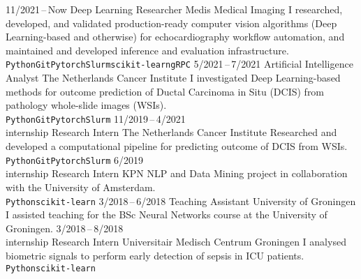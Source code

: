 \documentclass[9pt]{developercv}
\begin{document}


\begin{entrylist}
\entry
    {11/2021\,--\,Now}
    {Deep Learning Researcher}
    {Medis Medical Imaging}
    {I researched, developed, and validated production-ready computer vision algorithms (Deep Learning-based and otherwise) for echocardiography workflow automation, and maintained and developed inference and evaluation infrastructure.\\
    \texttt{Python}\slashsep\texttt{Git}\slashsep\texttt{Pytorch}\slashsep\texttt{Slurm}\slashsep\texttt{scikit-learn}\slashsep\texttt{gRPC}}
\entry
    {5/2021\,--\,7/2021}
    {Artificial Intelligence Analyst}
    {The Netherlands Cancer Institute}
    {I investigated Deep Learning-based methods for outcome prediction of Ductal Carcinoma in Situ (DCIS) from pathology whole-slide images (WSIs).\\
    \texttt{Python}\slashsep\texttt{Git}\slashsep\texttt{Pytorch}\slashsep\texttt{Slurm}}
\entry
    {11/2019\,--\,4/2021\\\footnotesize{internship}}
    {Research Intern}
    {The Netherlands Cancer Institute}
    {Researched and developed a computational pipeline for predicting outcome of DCIS from WSIs.\\
    \texttt{Python}\slashsep\texttt{Git}\slashsep\texttt{Pytorch}\slashsep\texttt{Slurm}}
\entry
    {6/2019\\\footnotesize{internship}}
    {Research Intern}
    {KPN}
    {NLP and Data Mining project in collaboration with the University of Amsterdam.\\
    \texttt{Python}\slashsep\texttt{scikit-learn}}
\entry
    {3/2018\,--\,6/2018}
    {Teaching Assistant}
    {University of Groningen}
    {I assisted teaching for the BSc Neural Networks course at the University of Groningen.}
\entry
    {3/2018\,--\,8/2018\\\footnotesize{internship}}
    {Research Intern}
    {Universitair Medisch Centrum Groningen}
    {I analysed biometric signals to perform early detection of sepsis in ICU patients.\\
    \texttt{Python}\slashsep\texttt{scikit-learn}}
\end{entrylist}


\end{document}
